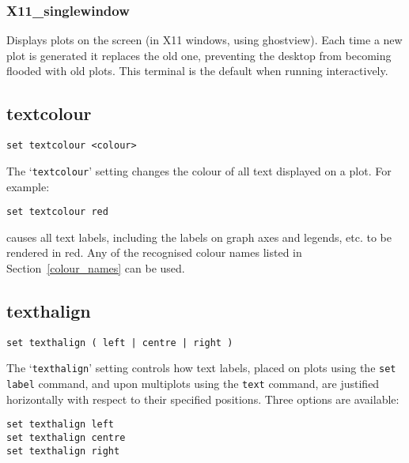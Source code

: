 \documentclass[a4paper,onecolumn,11pt]{book}
\begin{document}
\subsubsection{X11\_singlewindow}

Displays plots on the screen (in X11 windows, using ghostview). Each time a new
plot is generated it replaces the old one, preventing the desktop from becoming
flooded with old plots. This terminal is the default when running
interactively.

\subsection{textcolour}

\begin{verbatim}
set textcolour <colour>
\end{verbatim}

The `{\tt textcolour}' setting changes the colour of all text displayed on a plot.
For example:

\begin{verbatim}
set textcolour red
\end{verbatim}

\noindent causes all text labels, including the labels on graph axes and
legends, etc. to be rendered in red. Any of the recognised colour names listed
in Section~\ref{colour_names} can be used.

\subsection{texthalign}

\begin{verbatim}
set texthalign ( left | centre | right )
\end{verbatim}

The `{\tt texthalign}' setting controls how text labels, placed on plots using the
{\tt set label} command, and upon multiplots using the {\tt text} command, are
justified horizontally with respect to their specified positions. Three options
are available:

\begin{verbatim}
set texthalign left
set texthalign centre
set texthalign right
\end{verbatim}
\end{document}
